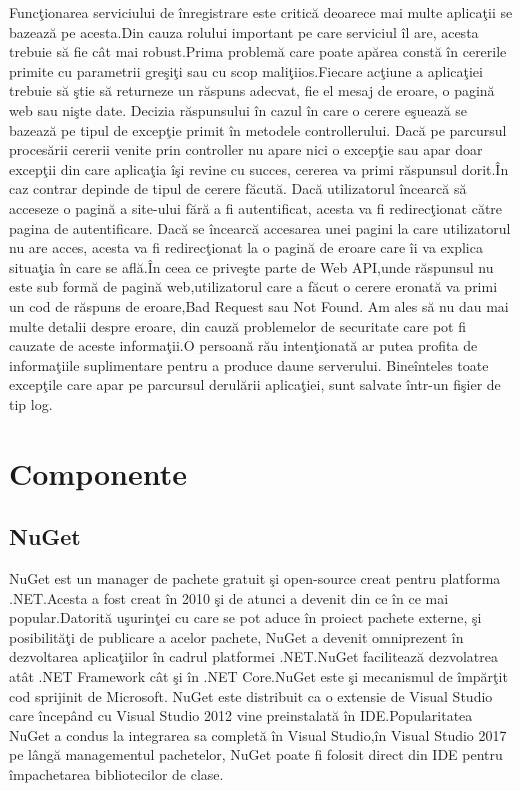 \documentclass[a4paper,12pt]{report}
\begin{document}
Func\c tionarea serviciului de \^inregistrare este critic\u a deoarece mai multe 
aplica\c tii se bazeaz\u a pe acesta.Din cauza rolului important pe care serviciul
\^il are, acesta trebuie s\u a fie c\^at mai robust.Prima problem\u a care poate  
ap\u area const\u a \^in cererile primite cu parametrii gre\c si\c ti sau cu scop
mali\c tiios.Fiecare ac\c tiune a aplica\c tiei trebuie s\u a \c stie s\u a returneze
un r\u aspuns adecvat, fie el mesaj de eroare, o pagin\u a web sau ni\c ste date.
Decizia r\u aspunsului \^in cazul \^in care o cerere e\c sueaz\u a se bazeaz\u a pe tipul
de excep\c tie primit \^in metodele controllerului.
Dac\u a pe parcursul proces\u arii cererii venite prin controller nu apare nici o 
excep\c tie sau apar doar excep\c tii din care aplica\c tia \^i\c si revine cu succes,
cererea va primi r\u aspunsul dorit.\^In caz contrar depinde de tipul de cerere f\u acut\u a.
Dac\u a utilizatorul \^incearc\u a s\u a acceseze o pagin\u a a site-ului f\u ar\u a a fi
autentificat, acesta va fi redirec\c tionat c\u atre pagina de autentificare.
Dac\u a se \^incearc\u a accesarea unei pagini la care utilizatorul nu are acces, acesta 
va fi redirec\c tionat la o pagin\u a de eroare care \^ii va explica situa\c tia \^in care 
se afl\u a.\^In ceea ce prive\c ste parte de Web API,unde r\u aspunsul nu este sub form\u a 
de pagin\u a web,utilizatorul care a f\u acut o cerere eronat\u a va primi un cod de 
r\u aspuns de eroare,Bad Request sau Not Found.
Am ales s\u a nu dau mai multe detalii despre eroare, din cauz\u a problemelor de securitate
care pot fi cauzate de aceste informa\c tii.O persoan\u a r\u au inten\c tionat\u a ar putea 
profita de informa\c tiile suplimentare pentru a produce daune serverului.
Bine\^inteles toate excep\c tile care apar pe parcursul derul\u arii aplica\c tiei,
sunt salvate \^intr-un fi\c sier de tip log.

\section{Componente}

\subsection{NuGet}

NuGet est un manager de pachete gratuit \c si open-source creat pentru platforma .NET.Acesta a fost creat \^in 2010
\c si de atunci a devenit din ce \^in ce mai popular.Datorit\u a u\c surin\c tei cu care se pot aduce \^in proiect 
pachete externe, \c si posibilit\u a\c ti de publicare a acelor pachete, NuGet a devenit omniprezent \^in 
dezvoltarea aplica\c tiilor \^in cadrul platformei .NET.NuGet faciliteaz\u a dezvolatrea at\^at .NET Framework
c\^at \c si \^in .NET Core.NuGet este \c si mecanismul de \^imp\u ar\c tit cod sprijinit de Microsoft.
NuGet este distribuit ca o extensie de Visual Studio care \^incep\^and cu Visual Studio 2012 vine preinstalat\u a
\^in IDE.Popularitatea NuGet a condus la integrarea sa complet\u a \^in Visual Studio,\^in Visual Studio 2017 pe 
l\^ang\u a managementul pachetelor, NuGet poate fi folosit direct din IDE pentru \^impachetarea bibliotecilor
de clase.
\end{document}
